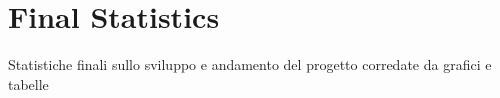 \chapter{Final Statistics}
Statistiche finali sullo sviluppo e andamento del progetto corredate da grafici e tabelle